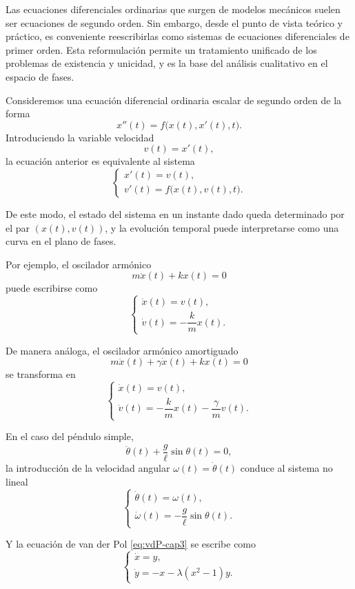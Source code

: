 \documentclass[12pt, a4paper]{amsbook}
\theoremstyle{remark}
\theoremstyle{definition}
\numberwithin{section}{chapter}
\numberwithin{subsection}{section}
\numberwithin{equation}{section}
\numberwithin{figure}{chapter}
\begin{document}
Las ecuaciones diferenciales ordinarias que surgen de modelos mecánicos suelen ser ecuaciones de segundo orden. Sin embargo, desde el punto de vista teórico y práctico, es conveniente reescribirlas como sistemas de ecuaciones diferenciales de primer orden. Esta reformulación permite un tratamiento unificado de los problemas de existencia y unicidad, y es la base del análisis cualitativo en el espacio de fases.

Consideremos una ecuación diferencial ordinaria escalar de segundo orden de la forma
\[
x''(t) = f\bigl(x(t), x'(t), t\bigr).
\]
Introduciendo la variable velocidad
\[
v(t) = x'(t),
\]
la ecuación anterior es equivalente al sistema
\[
\begin{cases}
x'(t) = v(t),\\
v'(t) = f\bigl(x(t), v(t), t\bigr).
\end{cases}
\]

De este modo, el estado del sistema en un instante dado queda determinado por el par $(x(t), v(t))$, y la evolución temporal puede interpretarse como una curva en el plano de fases.

Por ejemplo, el oscilador armónico
\[
m \ddot x(t) + k x(t) = 0
\]
puede escribirse como
\[
\begin{cases}
\dot x(t) = v(t),\\
\dot v(t) = -\dfrac{k}{m} x(t).
\end{cases}
\]

De manera análoga, el oscilador armónico amortiguado
\[
m \ddot x(t) + \gamma \dot x(t) + k x(t) = 0
\]
se transforma en
\[
\begin{cases}
\dot x(t) = v(t),\\
\dot v(t) = -\dfrac{k}{m} x(t) - \dfrac{\gamma}{m} v(t).
\end{cases}
\]

En el caso del péndulo simple,
\[
\ddot\theta(t) + \frac{g}{\ell}\sin\theta(t) = 0,
\]
la introducción de la velocidad angular $\omega(t) = \dot\theta(t)$ conduce al sistema no lineal
\[
\begin{cases}
\dot\theta(t) = \omega(t),\\
\dot\omega(t) = -\dfrac{g}{\ell}\sin\theta(t).
\end{cases}
\]

Y la ecuación de van der Pol \eqref{eq:vdP-cap3} se escribe como
\begin{equation}\label{eq:vdP-sistema}
\begin{cases}
\dot x = y,\\
\dot y = -x - \lambda(x^2-1)y .
\end{cases}
\end{equation}
\end{document}
